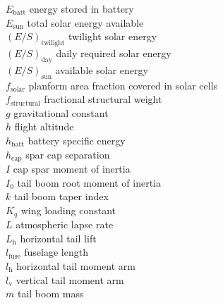 \begin{multicols}{2}
\begin{tabbing}
$E_{\text{batt}}$ \> energy stored in battery \\ %
$E_{\text{sun}}$ \> total solar energy available \\ %
$(E/S)_{\text{twilight}}$ \> twilight solar energy \\ %
$(E/S)_{\text{day}}$ \> daily required solar energy \\ %
$(E/S)_{\text{sun}}$ \> available solar energy \\ %
$f_{\text{solar}}$ \> planform area fraction covered in solar cells \\
$f_{\text{structural}}$ \> fractional structural weight\\
$g$ \> gravitational constant \\ %
$h$ \> flight altitude \\ %
$h_{\text{batt}}$ \> battery specific energy \\ %
$h_{\text{cap}}$ \> spar cap separation \\ %
$I$ \> cap spar moment of inertia \\ %
$I_0$ \> tail boom root moment of inertia \\ %
$k$ \> tail boom taper index \\
$K_q$ \> wing loading constant \\ %
$L$ \> atmospheric lapse rate \\ %
$L_\text{h}$ \> horizontal tail lift \\ %
$l_\text{fuse}$ \> fuselage length \\ %
$l_\text{h}$ \> horizontal tail moment arm \\ %
$l_\text{v}$ \> vertical tail moment arm \\ %
$m$ \> tail boom mass \\ %

\end{tabbing}
\end{multicols}

